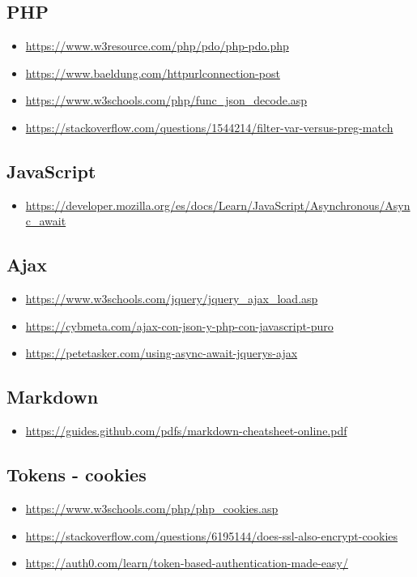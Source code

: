 \subsection[PHP]{PHP}\label{subsec:php}
\begin{itemize}
    \item \url{https://www.w3resource.com/php/pdo/php-pdo.php}
    \item \url{https://www.baeldung.com/httpurlconnection-post}
    \item \url{https://www.w3schools.com/php/func_json_decode.asp}
    \item \url{https://stackoverflow.com/questions/1544214/filter-var-versus-preg-match}
\end{itemize}


\subsection[JavaScript]{JavaScript}\label{subsec:javascript}
\begin{itemize}
    \item \url{https://developer.mozilla.org/es/docs/Learn/JavaScript/Asynchronous/Async_await}
\end{itemize}


\subsection[Ajax]{Ajax}\label{subsec:ajax}
\begin{itemize}
    \item \url{https://www.w3schools.com/jquery/jquery_ajax_load.asp}
    \item \url{https://cybmeta.com/ajax-con-json-y-php-con-javascript-puro}
    \item \url{https://petetasker.com/using-async-await-jquerys-ajax}
\end{itemize}


\subsection[Markdown]{Markdown}\label{subsec:markdown}
\begin{itemize}
    \item \url{https://guides.github.com/pdfs/markdown-cheatsheet-online.pdf}
\end{itemize}


\subsection[Tokens - cookies]{Tokens - cookies}\label{subsec:tokens---cookies}
\begin{itemize}
    \item \url{https://www.w3schools.com/php/php_cookies.asp}
    \item \url{https://stackoverflow.com/questions/6195144/does-ssl-also-encrypt-cookies}
    \item \url{https://auth0.com/learn/token-based-authentication-made-easy/}
\end{itemize}